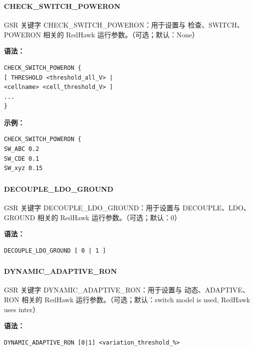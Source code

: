 \subsubsection{}
\paragraph*{CHECK_SWITCH_POWERON}

GSR 关键字 CHECK_SWITCH_POWERON：用于设置与 检查、SWITCH、POWERON 相关的 RedHawk 运行参数。（可选；默认：None）

\textbf{语法：}
\begin{lstlisting}
CHECK_SWITCH_POWERON {
[ THRESHOLD <threshold_all_V> |
<cellname> <cell_threshold_V> ]
...
}
\end{lstlisting}

\textbf{示例：}
\begin{lstlisting}
CHECK_SWITCH_POWERON {
SW_ABC 0.2
SW_CDE 0.1
SW_xyz 0.15
\end{lstlisting}

\subsubsection{}
\paragraph*{DECOUPLE_LDO_GROUND}

GSR 关键字 DECOUPLE_LDO_GROUND：用于设置与 DECOUPLE、LDO、GROUND 相关的 RedHawk 运行参数。（可选；默认：0）

\textbf{语法：}
\begin{lstlisting}
DECOUPLE_LDO_GROUND [ 0 | 1 ]
\end{lstlisting}

\subsubsection{}
\paragraph*{DYNAMIC_ADAPTIVE_RON}

GSR 关键字 DYNAMIC_ADAPTIVE_RON：用于设置与 动态、ADAPTIVE、RON 相关的 RedHawk 运行参数。（可选；默认：switch model is used, RedHawk uses inter）

\textbf{语法：}
\begin{lstlisting}
DYNAMIC_ADAPTIVE_RON [0|1] <variation_threshold_%>
\end{lstlisting}

